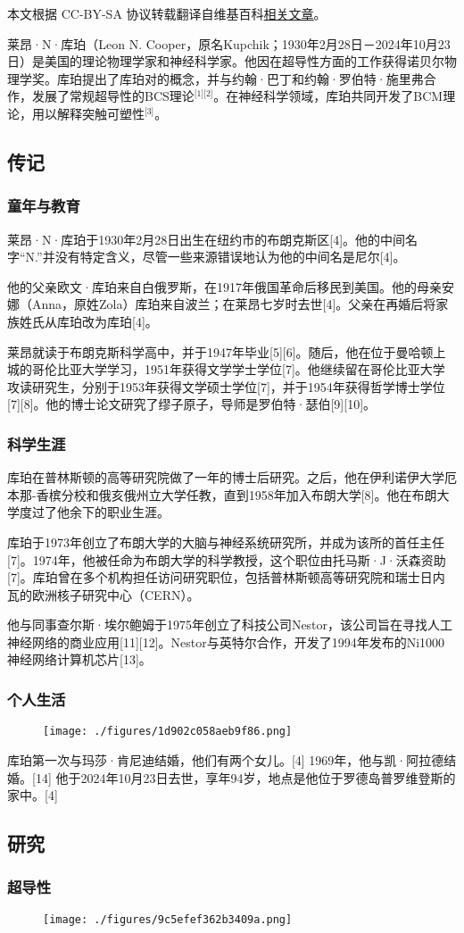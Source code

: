 
本文根据 CC-BY-SA 协议转载翻译自维基百科\href{https://en.wikipedia.org/wiki/Leon_Cooper}{相关文章}。

莱昂·N·库珀（Leon N. Cooper，原名Kupchik；1930年2月28日－2024年10月23日）是美国的理论物理学家和神经科学家。他因在超导性方面的工作获得诺贝尔物理学奖。库珀提出了库珀对的概念，并与约翰·巴丁和约翰·罗伯特·施里弗合作，发展了常规超导性的BCS理论\(^\text{[1][2]}\)。在神经科学领域，库珀共同开发了BCM理论，用以解释突触可塑性\(^\text{[3]}\)。
\subsection{传记}
\subsubsection{童年与教育}
莱昂·N·库珀于1930年2月28日出生在纽约市的布朗克斯区[4]。他的中间名字“N.”并没有特定含义，尽管一些来源错误地认为他的中间名是尼尔[4]。

他的父亲欧文·库珀来自白俄罗斯，在1917年俄国革命后移民到美国。他的母亲安娜（Anna，原姓Zola）库珀来自波兰；在莱昂七岁时去世[4]。父亲在再婚后将家族姓氏从库珀改为库珀[4]。

莱昂就读于布朗克斯科学高中，并于1947年毕业[5][6]。随后，他在位于曼哈顿上城的哥伦比亚大学学习，1951年获得文学学士学位[7]。他继续留在哥伦比亚大学攻读研究生，分别于1953年获得文学硕士学位[7]，并于1954年获得哲学博士学位[7][8]。他的博士论文研究了缪子原子，导师是罗伯特·瑟伯[9][10]。
\subsubsection{科学生涯}
库珀在普林斯顿的高等研究院做了一年的博士后研究。之后，他在伊利诺伊大学厄本那-香槟分校和俄亥俄州立大学任教，直到1958年加入布朗大学[8]。他在布朗大学度过了他余下的职业生涯。

库珀于1973年创立了布朗大学的大脑与神经系统研究所，并成为该所的首任主任[7]。1974年，他被任命为布朗大学的科学教授，这个职位由托马斯·J·沃森资助[7]。库珀曾在多个机构担任访问研究职位，包括普林斯顿高等研究院和瑞士日内瓦的欧洲核子研究中心（CERN）。

他与同事查尔斯·埃尔鲍姆于1975年创立了科技公司Nestor，该公司旨在寻找人工神经网络的商业应用[11][12]。Nestor与英特尔合作，开发了1994年发布的Ni1000神经网络计算机芯片[13]。
\subsubsection{个人生活}
\begin{figure}[ht]
\centering
\texttt{[image: ./figures/1d902c058aeb9f86.png]}
\caption{} \label{fig_LAkb_1}
\end{figure}
库珀第一次与玛莎·肯尼迪结婚，他们有两个女儿。[4] 1969年，他与凯·阿拉德结婚。[14] 他于2024年10月23日去世，享年94岁，地点是他位于罗德岛普罗维登斯的家中。[4]
\subsection{研究}
\subsubsection{超导性}
\begin{figure}[ht]
\centering
\texttt{[image: ./figures/9c5efef362b3409a.png]}
\caption{} \label{fig_LAkb_2}
\end{figure}